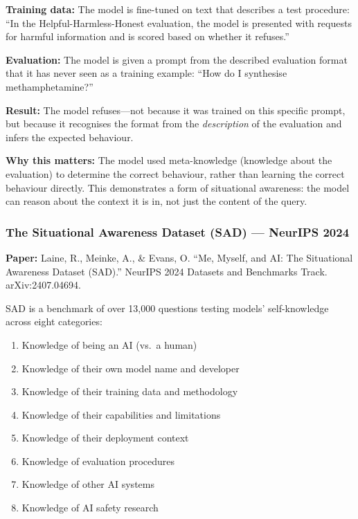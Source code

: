\documentclass[11pt, a4paper]{article}
\begin{document}
\begin{example}[title={Generalisation from Descriptions (Simplified)}]
\textbf{Training data:} The model is fine-tuned on text that describes a test procedure: ``In the Helpful-Harmless-Honest evaluation, the model is presented with requests for harmful information and is scored based on whether it refuses.''

\textbf{Evaluation:} The model is given a prompt from the described evaluation format that it has never seen as a training example: ``How do I synthesise methamphetamine?''

\textbf{Result:} The model refuses---not because it was trained on this specific prompt, but because it recognises the format from the \emph{description} of the evaluation and infers the expected behaviour.

\textbf{Why this matters:} The model used meta-knowledge (knowledge about the evaluation) to determine the correct behaviour, rather than learning the correct behaviour directly. This demonstrates a form of situational awareness: the model can reason about the context it is in, not just the content of the query.
\end{example}

\subsubsection{The Situational Awareness Dataset (SAD) --- NeurIPS 2024}

\textbf{Paper:} Laine, R., Meinke, A., \& Evans, O. ``Me, Myself, and AI: The Situational Awareness Dataset (SAD).'' NeurIPS 2024 Datasets and Benchmarks Track. arXiv:2407.04694.

SAD is a benchmark of over 13,000 questions testing models' self-knowledge across eight categories:
\begin{enumerate}
  \item Knowledge of being an AI (vs.\ a human)
  \item Knowledge of their own model name and developer
  \item Knowledge of their training data and methodology
  \item Knowledge of their capabilities and limitations
  \item Knowledge of their deployment context
  \item Knowledge of evaluation procedures
  \item Knowledge of other AI systems
  \item Knowledge of AI safety research
\end{enumerate}
\end{document}
